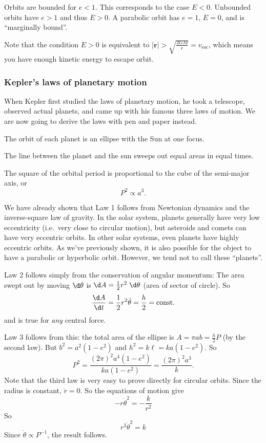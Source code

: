 \documentclass[a4paper]{article}
\begin{document}
Orbits are bounded for $e < 1$. This corresponds to the case $E < 0$. Unbounded orbits have $e > 1$ and thus $E > 0$. A parabolic orbit has $e = 1$, $E = 0$, and is ``marginally bound''.

Note that the condition $E > 0$ is equivalent to $|\dot{\mathbf{r}}| > \sqrt{\frac{2GM}{r}} = v_{\mathrm{esc}}$, which means you have enough kinetic energy to escape orbit.

\subsubsection*{Kepler's laws of planetary motion}
When Kepler first studied the laws of planetary motion, he took a telescope, observed actual planets, and came up with his famous three laws of motion. We are now going to derive the laws with pen and paper instead.

\begin{law}
  The orbit of each planet is an ellipse with the Sun at one focus.
\end{law}

\begin{law}
  The line between the planet and the sun sweeps out equal areas in equal times.
\end{law}

\begin{law}
  The square of the orbital period is proportional to the cube of the semi-major axis, or
  \[
    P^2 \propto a^3.
  \]
\end{law}

We have already shown that Law 1 follows from Newtonian dynamics and the inverse-square law of gravity. In the solar system, planets generally have very low eccentricity (i.e.\ very close to circular motion), but asteroids and comets can have very eccentric orbits. In other solar systems, even planets have highly eccentric orbits. As we've previously shown, it is also possible for the object to have a parabolic or hyperbolic orbit. However, we tend not to call these ``planets''.

Law 2 follows simply from the conservation of angular momentum: The area swept out by moving $\d \theta$ is $\d A = \frac{1}{2}r^2\;\d \theta$ (area of sector of circle). So
\[
  \frac{\d A}{\d t} = \frac{1}{2}r^2\dot{\theta} = \frac{h}{2} = \text{const}.
\]
and is true for \emph{any} central force.

Law 3 follows from this: the total area of the ellipse is $A = \pi ab = \frac{h}{2}P$ (by the second law). But $b^2 = a^2( 1 - e^2)$ and $h^2 = k\ell = ka(1 - e^2)$. So
\[
  P^2 = \frac{(2\pi)^2a^4(1 - e^2)}{ka(1 - e^2)} = \frac{(2\pi)^2 a^3}{k}.
\]
Note that the third law is very easy to prove directly for circular orbits. Since the radius is constant, $\ddot{r} = 0$. So the equations of motion give
\[
  -r \dot{\theta}^2 = -\frac{k}{r^2}
\]
So
\[
  r^3 \dot{\theta}^2 = k
\]
Since $\dot{\theta}\propto P^{-1}$, the result follows.
\end{document}
